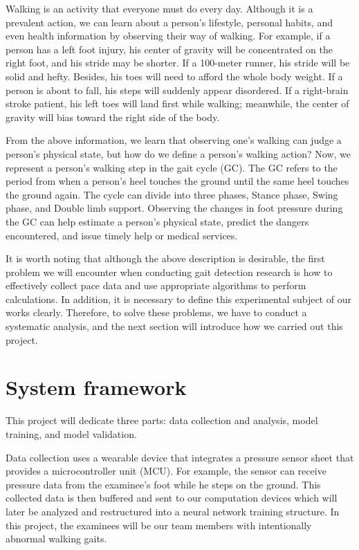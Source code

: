 \documentclass[10pt,twocolumn,letterpaper]{article}
\begin{document}
Walking is an activity that everyone must do every day. Although it is a prevalent action, we can learn about a person's lifestyle, personal habits, and even health information by observing their way of walking. For example, if a person has a left foot injury, his center of gravity will be concentrated on the right foot, and his stride may be shorter. If a 100-meter runner, his stride will be solid and hefty. Besides, his toes will need to afford the whole body weight. If a person is about to fall, his steps will suddenly appear disordered. If a right-brain stroke patient, his left toes will land first while walking; meanwhile, the center of gravity will bias toward the right side of the body.~\cite{10.1007/978-3-319-59147-6_30}

From the above information, we learn that observing one's walking can judge a person's physical state, but how do we define a person's walking action? Now, we represent a person's walking step in the gait cycle (GC). The GC refers to the period from when a person's heel touches the ground until the same heel touches the ground again. The cycle can divide into three phases, Stance phase, Swing phase, and Double limb support. Observing the changes in foot pressure during the GC can help estimate a person's physical state, predict the dangers encountered, and issue timely help or medical services.~\cite{CAMPS2018119}

It is worth noting that although the above description is desirable, the first problem we will encounter when conducting gait detection research is how to effectively collect pace data and use appropriate algorithms to perform calculations. In addition, it is necessary to define this experimental subject of our works clearly. Therefore, to solve these problems, we have to conduct a systematic analysis, and the next section will introduce how we carried out this project.~\cite{NUTT2011734}

\section{System framework}
\label{sec:framework}

This project will dedicate three parts: data collection and analysis, model training, and model validation.

Data collection uses a wearable device that integrates a pressure sensor sheet that provides a microcontroller unit (MCU). For example, the sensor can receive pressure data from the examinee's foot while he steps on the ground. This collected data is then buffered and sent to our computation devices which will later be analyzed and restructured into a neural network training structure. In this project, the examinees will be our team members with intentionally abnormal walking gaits.
\end{document}
